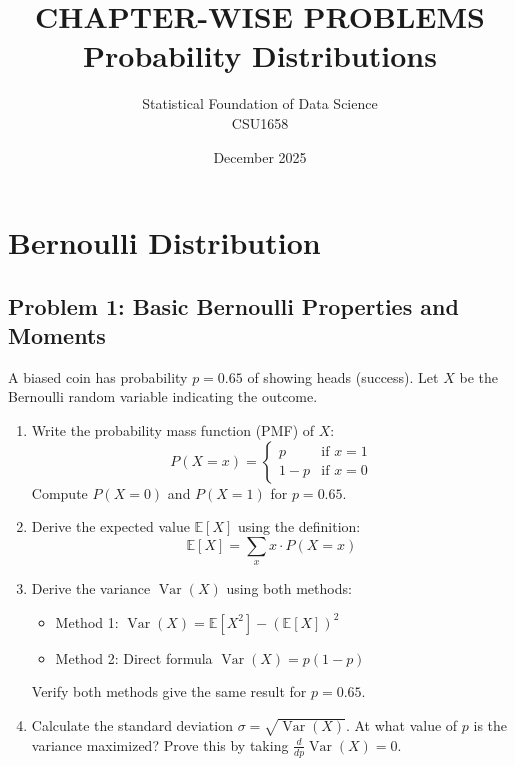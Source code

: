 \documentclass[12pt]{article}
\title{CHAPTER-WISE PROBLEMS\\
\large Probability Distributions}
\author{Statistical Foundation of Data Science\\
CSU1658}
\date{December 2025}
\DeclareMathOperator{\Var}{Var}
\begin{document}
\maketitle

\tableofcontents
\newpage


\section{Bernoulli Distribution}

\subsection*{Problem 1: Basic Bernoulli Properties and Moments}

A biased coin has probability \(p = 0.65\) of showing heads (success). Let \(X\) be the Bernoulli random variable indicating the outcome.

\begin{enumerate}[label=(\alph*)]
\item Write the probability mass function (PMF) of \(X\):
\[
P(X = x) = \begin{cases}
p & \text{if } x = 1 \\
1-p & \text{if } x = 0
\end{cases}
\]
Compute \(P(X = 0)\) and \(P(X = 1)\) for \(p = 0.65\).

\item Derive the expected value \(\mathbb{E}[X]\) using the definition:
\[
\mathbb{E}[X] = \sum_{x} x \cdot P(X = x)
\]

\item Derive the variance \(\Var(X)\) using both methods:
\begin{itemize}
\item Method 1: \(\Var(X) = \mathbb{E}[X^2] - (\mathbb{E}[X])^2\)
\item Method 2: Direct formula \(\Var(X) = p(1-p)\)
\end{itemize}
Verify both methods give the same result for \(p = 0.65\).

\item Calculate the standard deviation \(\sigma = \sqrt{\Var(X)}\). At what value of \(p\) is the variance maximized? Prove this by taking \(\frac{d}{dp}\Var(X) = 0\).
\end{enumerate}
\end{document}
